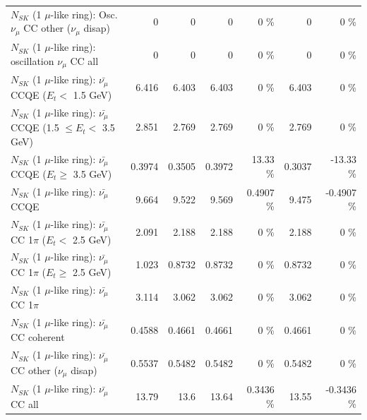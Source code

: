 \begin{table}
\begin{tabular}{| l | r | r | r  r | r  r |}
         $N_{SK}$ (1 $\mu$-like ring): Osc. $\nu_\mu$ CC other ($\nu_\mu$ disap) &               0 &               0 &               0 &        0 \%  &               0 &        0 \%  \\ 
                      $N_{SK}$ (1 $\mu$-like ring): oscillation $\nu_\mu$ CC all &               0 &               0 &               0 &        0 \%  &               0 &        0 \%  \\ 
\hline
\hline
          $N_{SK}$ (1 $\mu$-like ring): $\bar{\nu_\mu}$ CCQE ($E_{t} <$ 1.5 GeV) &           6.416 &           6.403 &           6.403 &        0 \%  &           6.403 &        0 \%  \\ 
 $N_{SK}$ (1 $\mu$-like ring): $\bar{\nu_\mu}$ CCQE (1.5 $\leq E_{t} <$ 3.5 GeV) &           2.851 &           2.769 &           2.769 &        0 \%  &           2.769 &        0 \%  \\ 
       $N_{SK}$ (1 $\mu$-like ring): $\bar{\nu_\mu}$ CCQE ($E_{t} \geq$ 3.5 GeV) &          0.3974 &          0.3505 &          0.3972 &    13.33 \%  &          0.3037 &   -13.33 \%  \\ 
\hline
                              $N_{SK}$ (1 $\mu$-like ring): $\bar{\nu_\mu}$ CCQE &           9.664 &           9.522 &           9.569 &   0.4907 \%  &           9.475 &  -0.4907 \%  \\ 
\hline
     $N_{SK}$ (1 $\mu$-like ring): $\bar{\nu_\mu}$ CC 1$\pi$ ($E_{t} <$ 2.5 GeV) &           2.091 &           2.188 &           2.188 &        0 \%  &           2.188 &        0 \%  \\ 
  $N_{SK}$ (1 $\mu$-like ring): $\bar{\nu_\mu}$ CC 1$\pi$ ($E_{t} \geq$ 2.5 GeV) &           1.023 &          0.8732 &          0.8732 &        0 \%  &          0.8732 &        0 \%  \\ 
\hline
                         $N_{SK}$ (1 $\mu$-like ring): $\bar{\nu_\mu}$ CC 1$\pi$ &           3.114 &           3.062 &           3.062 &        0 \%  &           3.062 &        0 \%  \\ 
                       $N_{SK}$ (1 $\mu$-like ring): $\bar{\nu_\mu}$ CC coherent &          0.4588 &          0.4661 &          0.4661 &        0 \%  &          0.4661 &        0 \%  \\ 
        $N_{SK}$ (1 $\mu$-like ring): $\bar{\nu_\mu}$ CC other ($\nu_\mu$ disap) &          0.5537 &          0.5482 &          0.5482 &        0 \%  &          0.5482 &        0 \%  \\ 
                          $N_{SK}$ (1 $\mu$-like ring): $\bar{\nu_{\mu}}$ CC all &           13.79 &            13.6 &           13.64 &   0.3436 \%  &           13.55 &  -0.3436 \%  \\ 

\end{tabular}
\end{table}
